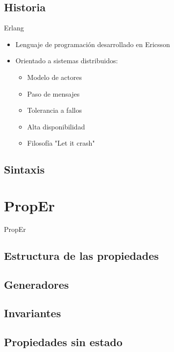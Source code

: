 \documentclass{beamer}
\begin{document}
    \subsection{Historia}
    \begin{frame}{Erlang}
      \begin{itemize}
        \item Lenguaje de programación desarrollado en Ericsson
        \item Orientado a sistemas distribuidos:
        \begin{itemize}
          \item Modelo de actores
          \item Paso de mensajes
          \item Tolerancia a fallos
          \item Alta disponibilidad
          \item Filosofía "Let it crash"
        \end{itemize}
      \end{itemize}
    \end{frame}
    \subsection{Sintaxis}
    \begin{frame}
    \end{frame}
  \section{PropEr}
    \begin{frame}{PropEr}

    \end{frame}
    \subsection{Estructura de las propiedades}
    \subsection{Generadores}
    \subsection{Invariantes}
    \subsection{Propiedades sin estado}
\end{document}
